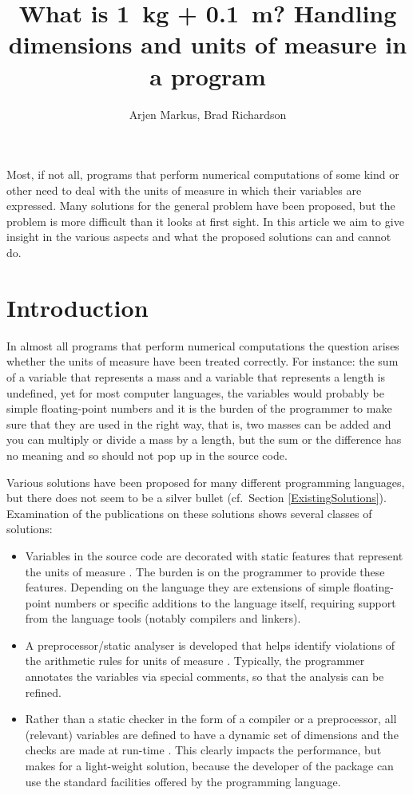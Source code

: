 \documentclass{article}
\begin{document}
\title{What is 1~kg + 0.1~m? Handling dimensions and units of measure in a program}

\author{Arjen Markus, Brad Richardson}

\maketitle

\abstract
Most, if not all, programs that perform numerical computations of some kind or other need to deal with
the units of measure in which their variables are expressed. Many solutions for the general problem
have been proposed, but the problem is more difficult than it looks at first sight. In this article we
aim to give insight in the various aspects and what the proposed solutions can and cannot do.

\section{Introduction}
In almost all programs that perform numerical computations the question arises whether the units of measure have
been treated correctly. For instance: the sum of a variable that represents a mass and a variable that represents
a length is undefined, yet for most computer languages, the variables would probably be simple floating-point
numbers and it is the burden of the programmer to make sure that they are used in the right way, that is,
two masses can be added and you can multiply or divide a mass by a length, but the sum or the difference has no meaning
and so should not pop up in the source code.

Various solutions have been proposed for many different programming languages, but there does not seem to be a
silver bullet (cf.\ Section \ref{ExistingSolutions}). Examination of the publications on these solutions shows several
classes of solutions:
\begin{itemize}
\item
Variables in the source code are decorated with static features that represent the units of measure
\cite{DimensionalityCheckingAda, BlogAdaPhysicalUnitsGeneric, QuaffFortranPackage, PhysicalEngineeringUnitsN2113}. The burden is
on the programmer to provide these features. Depending on the language they are extensions of simple floating-point numbers
or specific additions to the language itself, requiring support from the language tools (notably compilers and linkers).
\item
A preprocessor/static analyser is developed that helps identify violations of the arithmetic rules for units of measure
\cite{SimConFPTCheckingUnits}.
Typically, the programmer annotates the variables via special comments, so that the analysis can be refined.
\item
Rather than a static checker in the form of a compiler or a preprocessor, all (relevant) variables are defined to have
a dynamic set of dimensions and the checks are made at run-time \cite{PhysUnitsPetty}. This clearly impacts the performance, but makes for
a light-weight solution, because the developer of the package can use the standard facilities offered by the programming
language.
\end{itemize}
\end{document}
